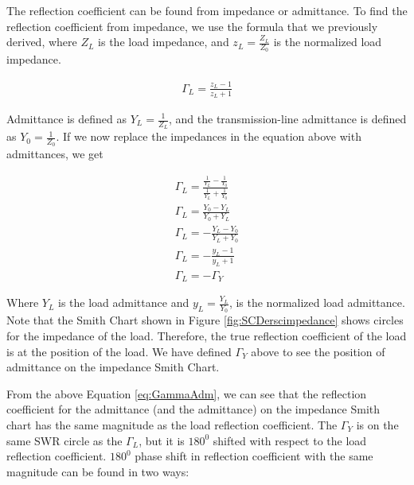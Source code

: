 \documentclass{ximera}
\begin{document}
The reflection coefficient can be found from impedance or admittance. To find the reflection coefficient from impedance, we use the formula that we previously derived, where $Z_L$ is the load impedance, and $z_L=\frac{Z_L}{Z_0}$ is the normalized load impedance.

\begin{eqnarray}
\Gamma_L=\frac{z_L-1}{z_L+1} \label{eq:GammaImp} 
\end{eqnarray}


Admittance is defined as $Y_L=\frac{1}{Z_L}$, and the transmission-line admittance is defined as $Y_0=\frac{1}{Z_0}$. If we now replace the impedances in the equation above with admittances, we get


\begin{eqnarray}
\Gamma_L = \frac{\frac{1}{Y_L}-\frac{1}{Y_0}}{\frac{1}{Y_L}+\frac{1}{Y_0}} \\
\Gamma_L = \frac{Y_0-Y_L}{Y_0+Y_L} \\
\Gamma_L = -  \frac{Y_L-Y_0}{Y_L+Y_0} \\
\Gamma_L = -  \frac{y_L-1}{y_L+1} \\
\Gamma_L = -\Gamma_Y \label{eq:GammaAdm}
\end{eqnarray}


Where $Y_L$ is the load admittance and $y_L=\frac{Y_L}{Y_0} $, is the normalized load admittance. Note that the Smith Chart shown in Figure \ref{fig:SCDerscimpedance} shows circles for the impedance of the load. Therefore, the true reflection coefficient of the load is at the position of the load. We have defined $\Gamma_Y $ above to see the position of admittance on the impedance Smith Chart. 


 From the above Equation \ref{eq:GammaAdm}, we can see that the reflection coefficient for the admittance (and the admittance) on the impedance Smith chart has the same magnitude as the load reflection coefficient. The $\Gamma_Y$ is on the same SWR circle as the $\Gamma_L$, but it is $180^0$ shifted with respect to the load reflection coefficient. $180^0$ phase shift in reflection coefficient with the same magnitude can be found in two ways:
 
\end{document}
